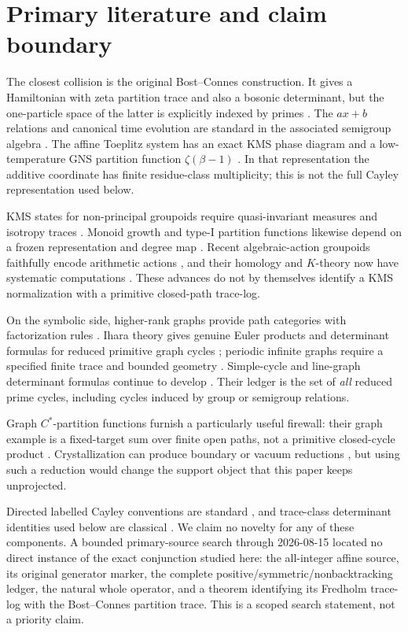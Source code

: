 \section{Primary literature and claim boundary}
\label{sec:literature}

The closest collision is the original Bost--Connes construction.  It gives a
Hamiltonian with zeta partition trace and also a bosonic determinant, but the
one-particle space of the latter is explicitly indexed by primes
\citep{BostConnes1995}.  The $ax+b$ relations and canonical time evolution are
standard in the associated semigroup algebra \citep{Cuntz2008}.  The affine
Toeplitz system has an exact KMS phase diagram and a low-temperature GNS
partition function $\zeta(\beta-1)$ \citep{LacaRaeburn2010}.  In that
representation the additive coordinate has finite residue-class
multiplicity; this is not the full Cayley representation used below.

KMS states for non-principal groupoids require quasi-invariant measures and
isotropy traces \citep{Neshveyev2013}.  Monoid growth and type-I partition
functions likewise depend on a frozen representation and degree map
\citep{BruceLacaRamaggeSims2019,BruceLacaTakeishi2021}.  Recent algebraic-action
groupoids faithfully encode arithmetic actions \citep{BruceLi2024}, and their
homology and $K$-theory now have systematic computations
\citep{BruceKubotaTakeishi2026}.  These advances do not by themselves identify
a KMS normalization with a primitive closed-path trace-log.

On the symbolic side, higher-rank graphs provide path categories with
factorization rules \citep{KumjianPask2000}.  Ihara theory gives genuine
Euler products and determinant formulas for reduced primitive graph cycles
\citep{StarkTerras1996}; periodic infinite graphs require a specified finite
trace and bounded geometry \citep{GuidoIsolaLapidus2008}.  Simple-cycle and
line-graph determinant formulas continue to develop
\citep{Watanabe2026}.  Their ledger is the set of \emph{all} reduced prime
cycles, including cycles induced by group or semigroup relations.

Graph $C^*$-partition functions furnish a particularly useful firewall:
their graph example is a fixed-target sum over finite open paths, not a
primitive closed-cycle product \citep{BruceTakeishi2024}.  Crystallization can
produce boundary or vacuum reductions \citep{LacaNeshveyevYamashita2025}, but
using such a reduction would change the support object that this paper keeps
unprojected.

Directed labelled Cayley conventions are standard \citep{Caucal2020}, and
trace-class determinant identities used below are classical
\citep{Simon2005}.  We claim no novelty for any of these components.  A
bounded primary-source search through 2026-08-15 located no direct instance
of the exact conjunction studied here: the all-integer affine source, its
original generator marker, the complete positive/symmetric/nonbacktracking
ledger, the natural whole operator, and a theorem identifying its Fredholm
trace-log with the Bost--Connes partition trace.  This is a scoped search
statement, not a priority claim.
